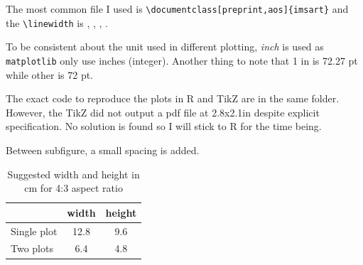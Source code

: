\documentclass[preprint,aos]{imsart}
\begin{document}
The most common file I used is \verb|\documentclass[preprint,aos]{imsart}|
and the \verb|\linewidth| is \prntlen{\linewidth},
\prntlen{\linewidth}, \prntlen{\linewidth},
\prntlen{\linewidth}.

To be consistent about the unit used in different plotting, \emph{inch} 
is used as \verb|matplotlib| only use inches (integer). 
Another thing to note that 1 in is 72.27 pt while other is 72 pt.

The exact code to reproduce the plots in R and TikZ are in the same folder.
However, the TikZ did not output a pdf file at 2.8x2.1in despite explicit specification.
No solution is found so I will stick to R for the time being.

Between subfigure, a small spacing is added.

\begin{table}[ht]
\centering
\caption{Suggested width and height in cm for 4:3 aspect ratio}
\begin{tabular}{lcc}
\toprule
            & width & height \\
\midrule
Single plot & 12.8  & 9.6    \\
Two plots   & 6.4   & 4.8    \\
\bottomrule
\end{tabular}
\end{table}
\end{document}
